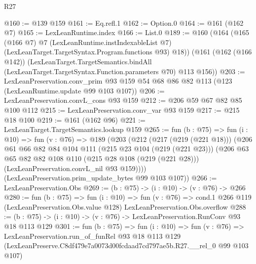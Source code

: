 \begin{lexlean}{R27}
\begin{coremodule}
@160 := @139 @159
@161 := Eq.refl.{1}
@162 := Option.{0}
@164 := @161 (@162 @7)
@165 := LexLeanRuntime.index
@166 := List.{0}
@189 := @160
    (@164
      (@165
        (@166 @7)
        @7
        (LexLeanRuntime.instIndexableList @7)
        (LexLeanTarget.TargetSyntax.Program.functions @93)
        @18))
    (@161
      (@162 (@166 @142))
      (LexLeanTarget.TargetSemantics.bindAll
        (LexLeanTarget.TargetSyntax.Function.parameters @70)
        @113
        @156))
@203 := LexLeanPreservation.conv_prim
    @93
    @159
    @54
    @68
    @86
    @82
    @113
    (@123 (LexLeanRuntime.update @99 @103 @107))
@206 := LexLeanPreservation.convL_cons @93 @159
@212 := @206 @59 @67 @82 @85 @100 @112
@215 := LexLeanPreservation.conv_var @93 @159
@217 := @215 @18 @100
@219 := @161 (@162 @96)
@221 := LexLeanTarget.TargetSemantics.lookup @159
@265 := fun (b : @75) =>
  fun (i : @10) =>
  fun (v : @76) =>
  @189
    (@203
      (@212
        (@217 (@219 (@221 @18)))
        (@206
          @61
          @66
          @82
          @84
          @104
          @111
          (@215 @23 @104 (@219 (@221 @23)))
          (@206
            @63
            @65
            @82
            @82
            @108
            @110
            (@215 @28 @108 (@219 (@221 @28)))
            (LexLeanPreservation.convL_nil @93 @159))))
      (LexLeanPreservation.prim_update_bytes @99 @103 @107))
@266 := LexLeanPreservation.Obs
@269 := (b : @75) -> (i : @10) -> (v : @76) -> @266
@280 := fun (b : @75) =>
  fun (i : @10) =>
  fun (v : @76) =>
  cond.{1} @266 @119 (LexLeanPreservation.Obs.value @128) LexLeanPreservation.Obs.overflow
@288 := (b : @75) -> (i : @10) -> (v : @76) -> LexLeanPreservation.RunConv @93 @18 @113 @129
@301 := fun (b : @75) =>
  fun (i : @10) =>
  fun (v : @76) =>
  LexLeanPreservation.run_of_funRel
    @93
    @18
    @113
    @129
    (LexLeanPreserve.C8df479e7a0073d00fcdaad7cd797ae5b.R27.__rel_0 @99 @103 @107)
\end{coremodule}
\end{lexlean}

